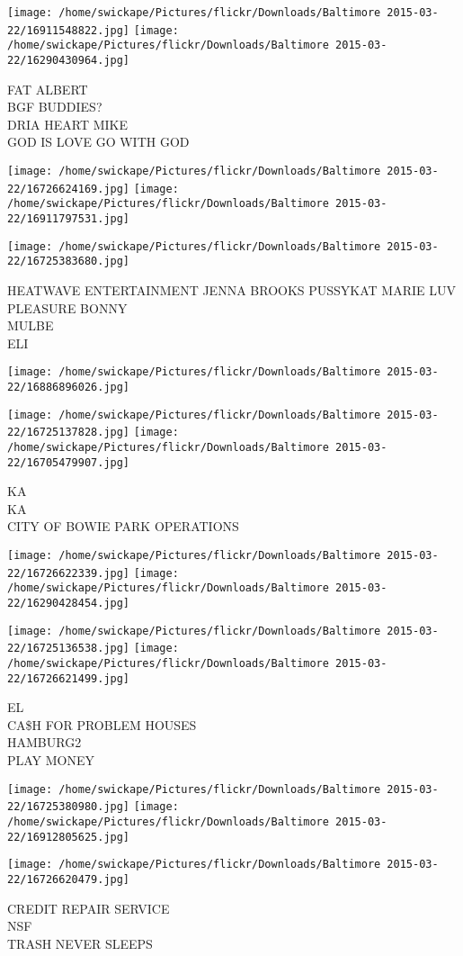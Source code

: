 \documentclass[10pt,letterpaper]{article}
\begin{document}
\texttt{[image: /home/swickape/Pictures/flickr/Downloads/Baltimore 2015-03-22/16911548822.jpg]}
\texttt{[image: /home/swickape/Pictures/flickr/Downloads/Baltimore 2015-03-22/16290430964.jpg]}

FAT ALBERT\\
BGF BUDDIES?\\
DRIA HEART MIKE\\
GOD IS LOVE GO WITH GOD
\pagebreak

\texttt{[image: /home/swickape/Pictures/flickr/Downloads/Baltimore 2015-03-22/16726624169.jpg]}
\texttt{[image: /home/swickape/Pictures/flickr/Downloads/Baltimore 2015-03-22/16911797531.jpg]}

\texttt{[image: /home/swickape/Pictures/flickr/Downloads/Baltimore 2015-03-22/16725383680.jpg]}

HEATWAVE ENTERTAINMENT JENNA BROOKS PUSSYKAT MARIE LUV PLEASURE BONNY\\
MULBE\\
ELI
\pagebreak

\texttt{[image: /home/swickape/Pictures/flickr/Downloads/Baltimore 2015-03-22/16886896026.jpg]}

\vspace{0.25in}
\texttt{[image: /home/swickape/Pictures/flickr/Downloads/Baltimore 2015-03-22/16725137828.jpg]}
\texttt{[image: /home/swickape/Pictures/flickr/Downloads/Baltimore 2015-03-22/16705479907.jpg]}

KA\\
KA\\
CITY OF BOWIE PARK OPERATIONS
\pagebreak

\texttt{[image: /home/swickape/Pictures/flickr/Downloads/Baltimore 2015-03-22/16726622339.jpg]}
\texttt{[image: /home/swickape/Pictures/flickr/Downloads/Baltimore 2015-03-22/16290428454.jpg]}

\texttt{[image: /home/swickape/Pictures/flickr/Downloads/Baltimore 2015-03-22/16725136538.jpg]}
\texttt{[image: /home/swickape/Pictures/flickr/Downloads/Baltimore 2015-03-22/16726621499.jpg]}

EL\\
CA\$H FOR PROBLEM HOUSES\\
HAMBURG2\\
PLAY MONEY
\pagebreak

\texttt{[image: /home/swickape/Pictures/flickr/Downloads/Baltimore 2015-03-22/16725380980.jpg]}
\texttt{[image: /home/swickape/Pictures/flickr/Downloads/Baltimore 2015-03-22/16912805625.jpg]}

\vspace{0.25in}
\texttt{[image: /home/swickape/Pictures/flickr/Downloads/Baltimore 2015-03-22/16726620479.jpg]}

CREDIT REPAIR SERVICE\\
NSF\\
TRASH NEVER SLEEPS
\pagebreak
\end{document}
